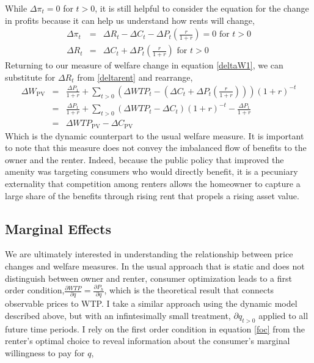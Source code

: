 \documentclass[ecta,nameyear,draft]{econsocart}
\theoremstyle{plain}
\theoremstyle{remark}
\begin{document}
While $\Delta\pi_t=0$ for $t>0$, it is still helpful to consider the equation for the change in profits because it can help us understand how rents will change,
\begin{eqnarray}
	\Delta \pi_t &=& \Delta R_t-\Delta C_t-\Delta P_t\left(\frac{r}{1+r}\right)=0 \text{ for } t>0\nonumber\\
	\Delta R_t &=& \Delta C_t+\Delta P_t \left(\frac{r}{1+r}\right)  \text{ for } t>0\label{deltarent}
\end{eqnarray}
Returning to our measure of welfare change in equation \ref{deltaW1}, we can substitute for $\Delta R_t$  from \ref{deltarent} and rearrange,
\begin{eqnarray}
	\Delta W_{\mathrm{PV}}&=&\frac{\Delta P_1}{1+r}+\sum_{t>0} (\Delta \mathit{WTP}_t-\left(\Delta C_t+\Delta P_t \left(\frac{r}{1+r}\right)\right))(1+r)^{-t} \nonumber\\
	&=&\frac{\Delta P_1}{1+r}+\sum_{t>0} (\Delta \mathit{WTP}_t-\Delta C_t)(1+r)^{-t}-\frac{\Delta P_1}{1+r}\nonumber\\
	&=&\Delta \mathit{WTP}_{\mathrm{PV}}-\Delta C_{\mathrm{PV}} \label{deltaW2}
\end{eqnarray}
Which is the dynamic counterpart to the usual welfare measure. It is important to note that this measure does not convey the imbalanced flow of benefits to the owner and the renter. Indeed, because the public policy that improved the amenity was targeting consumers who would directly benefit, it is a pecuniary externality that competition among renters allows the homeowner to capture a large share of the benefits through rising rent that propels a rising asset value.

\subsection{Marginal Effects}
We are ultimately interested in understanding the relationship between price changes and welfare measures. In the usual approach that is static and does not distinguish between owner and renter, consumer optimization leads to a first order condition,$\frac{\partial{\mathit{WTP}}}{\partial q}=\frac{\partial P_h}{\partial q}$, which is the theoretical result that connects observable prices to WTP. I take a similar approach using the dynamic model described above, but with an infintesimally small treatment, $\partial q_{t>0}$ applied to all future time periods. I rely on the first order condition in equation \ref{foc} from the renter's optimal choice to reveal information about the consumer's marginal willingness to pay for $q$,
\end{document}
